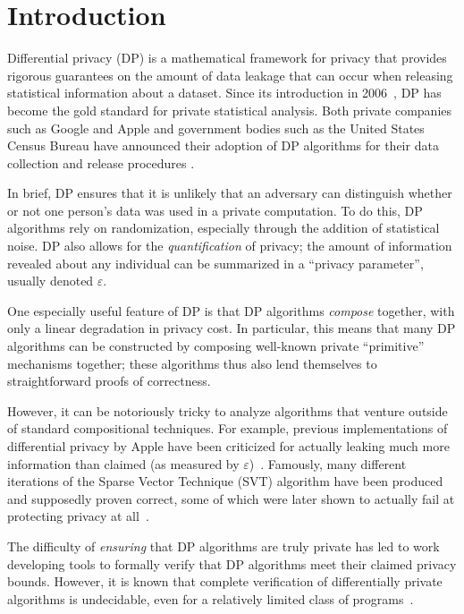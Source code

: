 
\section{Introduction}

Differential privacy (DP) is a mathematical framework for privacy that provides rigorous guarantees on the amount of data leakage that can occur when releasing statistical information about a dataset. Since its introduction in 2006~\cite{dworkCalibratingNoiseSensitivity2006a}, DP has become the gold standard for private statistical analysis. 
Both private companies such as Google and Apple and government bodies such as the United States Census Bureau have announced their adoption of DP algorithms for their data collection and release procedures \cite{HowWeRe,PrivacyFeaturesa,LearningPrivacyScalea,abowdCensusBureauAdopts2018a}. 

In brief, DP ensures that it is unlikely that an adversary can distinguish whether or not one person's data was used in a private computation. To do this, DP algorithms rely on randomization, especially through the addition of statistical noise. DP also allows for the \textit{quantification} of privacy; the amount of information revealed about any individual can be summarized in a ``privacy parameter'', usually denoted $\varepsilon$. 

One especially useful feature of DP is that DP algorithms \textit{compose} together, with only a linear degradation in privacy cost. In particular, this means that many DP algorithms can be constructed by composing well-known private ``primitive'' mechanisms together; these algorithms thus also lend themselves to straightforward proofs of correctness. 

However, it can be notoriously tricky to analyze algorithms that venture outside of standard compositional techniques. For example, previous implementations of differential privacy by Apple have been criticized for actually leaking much more information than claimed (as measured by $\varepsilon$)~\cite{tangPrivacyLossApple2017,gadottiPoolInferenceAttacks2022}. 
Famously, many different iterations of the Sparse Vector Technique (SVT) algorithm have been produced and supposedly proven correct, some of which were later shown to actually fail at protecting privacy at all~\cite{lyuUnderstandingSparseVector2016a}. 

The difficulty of \textit{ensuring} that DP algorithms are truly private has led to work developing tools to formally verify that DP algorithms meet their claimed privacy bounds. However, it is known that complete verification of differentially private algorithms is undecidable, even for a relatively limited class of programs~\cite{bartheDecidingDifferentialPrivacy2020}.

